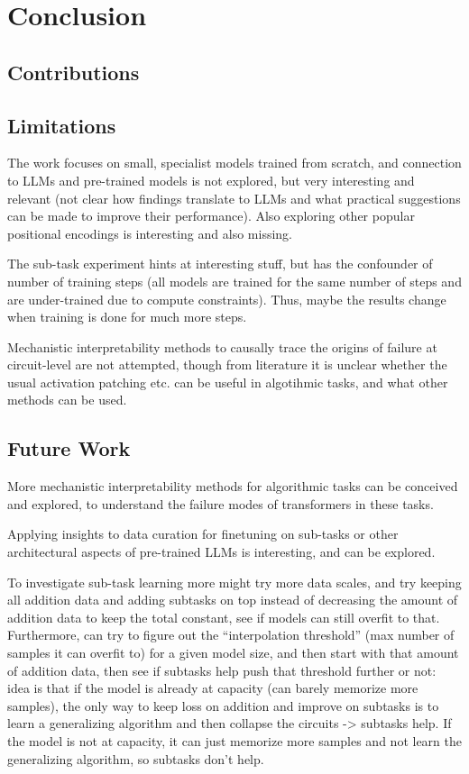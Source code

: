 \chapter{Conclusion}\label{conclusion}


\section{Contributions}


\section{Limitations}
The work focuses on small, specialist models trained from scratch, and connection to LLMs and pre-trained models is not explored, but very interesting and relevant (not clear how findings translate to LLMs and what practical suggestions can be made to improve their performance). Also exploring other popular positional encodings is interesting and also missing.

The sub-task experiment hints at interesting stuff, but has the confounder of number of training steps (all models are trained for the same number of steps and are under-trained due to compute constraints). Thus, maybe the results change when training is done for much more steps.

Mechanistic interpretability methods to causally trace the origins of failure at circuit-level are not attempted, though from literature it is unclear whether the usual activation patching etc. can be useful in algotihmic tasks, and what other methods can be used.


\section{Future Work}
More mechanistic interpretability methods for algorithmic tasks can be conceived and explored, to understand the failure modes of transformers in these tasks.

Applying insights to data curation for finetuning on sub-tasks or other architectural aspects of pre-trained LLMs is interesting, and can be explored.

To investigate sub-task learning more might try more data scales, and try keeping all addition data and adding subtasks on top instead of decreasing the amount of addition data to keep the total constant, see if models can still overfit to that. Furthermore, can try to figure out the ``interpolation threshold'' (max number of samples it can overfit to) for a given model size, and then start with that amount of addition data, then see if subtasks help push that threshold further or not: idea is that if the model is already at capacity (can barely memorize more samples), the only way to keep loss on addition and improve on subtasks is to learn a generalizing algorithm and then collapse the circuits -> subtasks help. If the model is not at capacity, it can just memorize more samples and not learn the generalizing algorithm, so subtasks don't help.

